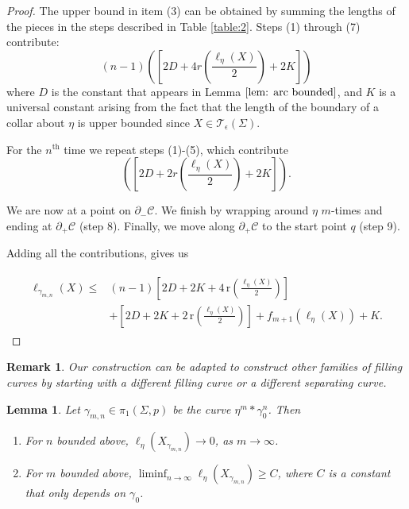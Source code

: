 \documentclass[12pt]{amsart}
\numberwithin{equation}{section}
\theoremstyle{plain}
\newtheorem{lem}[thm]{Lemma}
\newtheorem{rem}[thm]{Remark}
\begin{document}
\begin{proof}
 The upper bound in item (3) can be obtained by summing the lengths of the pieces in the steps described in Table \ref{table:2}.
Steps (1) through (7) contribute:  $$(n-1)\left( \left[2D+ 4r\left(\frac{\ell_{\eta}(X)}{2}\right)+2 K\right]\right )$$
where $D$ is the constant that appears in Lemma  $\ref{lem: arc bounded}$, and $K$ is a universal constant arising from the fact that  the length of the boundary of a collar about $\eta$ is upper bounded since 
$X \in \mathcal{T}_{\epsilon}(\Sigma)$.

For the $n^\text{th}$ time we repeat steps (1)-(5), which contribute $$ \left(\left[2D+ 2r\left(\frac{\ell_{\eta}(X)}{2}\right)+2 K\right]\right ).$$ 

We are now at a point on $\partial_{-} \mathcal{C}$. We finish by wrapping around $\eta$ $m$-times and ending at 
$\partial_{+} \mathcal{C}$ (step 8).
Finally,  we move along $\partial_{+} \mathcal{C}$ to the start point $q$ (step 9).


Adding all the contributions, gives us 
 
 \begin{align*}
 \begin{split}
    \ell_{\gamma_{m,n}}(X) \leq & 
 (n-1)\left[2D+ 2K +4\, \text{r}\left(\frac{\ell_{\eta}(X)}{2}\right)   \right]\\
    &+\left[2D+ 2K +2\, \text{r}\left(\frac{\ell_{\eta}(X)}{2}\right)   \right]+ f_{m+1}(\ell_{\eta}(X)) + K.
    \end{split}
 \end{align*}
   
\end{proof}

\begin{rem}
    Our construction can be adapted to construct other families of filling curves by starting with a different filling curve or a different separating curve.
\end{rem}





\begin{lem}\label{lem:etagoestozero} 
Let $\gamma_{m,n} \in \pi_1 (\Sigma,p)$
be the curve $\eta^{m}\ast  \gamma_{0}^{n}$. Then
\begin{enumerate}
\item  For $n$ bounded above, $\ell_{\eta}(X_{\gamma_{m,n}}) \rightarrow 0$, as $m \rightarrow \infty$.
\item For $m$ bounded above, 
$\liminf_{n \rightarrow \infty} \ell_{\eta}(X_{\gamma_{m,n}}) \geq C$, where $C$ is a constant that only depends on $\gamma_{0}$.
\end{enumerate}
\end{lem}
\end{document}
